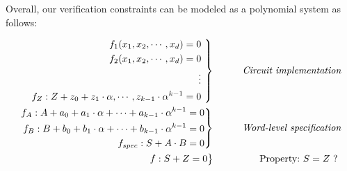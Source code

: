 Overall, our verification constraints can be modeled as a polynomial
system as follows:  

\begin{eqnarray}
 \left .  \begin{aligned}
f_1(x_1,x_2,\cdots, x_d)=0  \\
f_2(x_1,x_2,\cdots, x_d)=0  \\
\vdots  \\
f_{Z}: Z+z_{0}+z_{1}\cdot \alpha,\cdots,{z_{k-1}}\cdot \alpha^{k-1}=0   
 \end{aligned} 
\ \right\}
 &\qquad&  \text{\it Circuit implementation} \nonumber \\
 \left . \begin{aligned}
f_{A}:A+a_0+a_1\cdot \alpha+\cdots+a_{k-1}\cdot \alpha^{k-1}=0   \\ 
f_{B}:B+b_0+b_1\cdot \alpha+\cdots+b_{k-1}\cdot \alpha^{k-1}=0   \\ 
f_{spec}: S+A\cdot B =0   
 \end{aligned} 
\right\}
 &\qquad&  \text{\it Word-level specification} \nonumber \\
 \left .  \begin{aligned}
f:S+Z=0  \nonumber 
 \end{aligned} 
\right\}
 &\qquad& \text{Property:}~S = Z~?~
\end{eqnarray}


